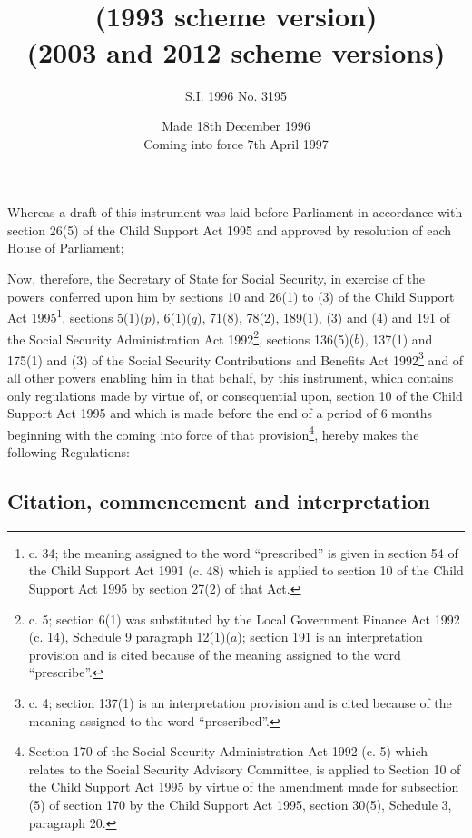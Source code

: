 \documentclass[12pt,a4paper]{article}
\title{\regstitle\\(1993 scheme version)}
\title{\regstitle\\(2003 and 2012 scheme versions)}
\author{S.I. 1996 No. 3195}
\date{Made 18th December 1996\\Coming into force 7th April 1997
}
\begin{document}
\maketitle

\noindent
Whereas a draft of this instrument was laid before Parliament in accordance with section 26(5) of the Child Support Act 1995 and approved by resolution of each House of Parliament;

 Now, therefore, the Secretary of State for Social Security, in exercise of the powers conferred upon him by sections 10 and 26(1) to (3) of the Child Support Act 1995\footnote{ c. 34; the meaning assigned to the word “prescribed” is given in section 54 of the Child Support Act 1991 (c. 48) which is applied to section 10 of the Child Support Act 1995 by section 27(2) of that Act.}, sections 5(1)($p$), 6(1)($q$), 71(8), 78(2), 189(1), (3) and (4) and 191 of the Social Security Administration Act 1992\footnote{ c. 5; section 6(1) was substituted by the Local Government Finance Act 1992 (c. 14), Schedule 9 paragraph 12(1)($a$); section 191 is an interpretation provision and is cited because of the meaning assigned to the word “prescribe”.}, sections 136(5)($b$), 137(1) and 175(1) and (3) of the Social Security Contributions and Benefits Act 1992\footnote{ c. 4; section 137(1) is an interpretation provision and is cited because of the meaning assigned to the word “prescribed”.} and of all other powers enabling him in that behalf, by this instrument, which contains only regulations made by virtue of, or consequential upon, section 10 of the Child Support Act 1995 and which is made before the end of a period of 6 months beginning with the coming into force of that provision\footnote{\frenchspacing Section 170 of the Social Security Administration Act 1992 (c. 5) which relates to the Social Security Advisory Committee, is applied to Section 10 of the Child Support Act 1995 by virtue of the amendment made for subsection (5) of section 170 by the Child Support Act 1995, section 30(5), Schedule 3, paragraph 20.}, hereby makes the following Regulations:

\enlargethispage{-\baselineskip}


{\sloppy

\tableofcontents

}

\setcounter{secnumdepth}{-2}

\subsection[1. Citation, commencement and interpretation]{Citation, commencement and interpretation}
\end{document}
